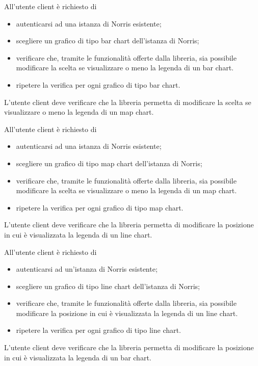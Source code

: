 		All'utente client è richiesto di
		\begin{itemize}
			\item autenticarsi ad una istanza di Norris esistente;
			\item scegliere un grafico di tipo bar chart dell'istanza di Norris;
			\item verificare che, tramite le funzionalità offerte dalla libreria, sia possibile modificare la scelta se visualizzare o meno la legenda di un bar chart.
			\item ripetere la verifica per ogni grafico di tipo bar chart.
		\end{itemize}

	L'utente client deve verificare che la libreria permetta di modificare la scelta se visualizzare o meno la legenda di un map chart.
		
		All'utente client è richiesto di
		\begin{itemize}
			\item autenticarsi ad una istanza di Norris esistente;
			\item scegliere un grafico di tipo map chart dell'istanza di Norris;
			\item verificare che, tramite le funzionalità offerte dalla libreria, sia possibile modificare la scelta se visualizzare o meno la legenda di un map chart.
			\item ripetere la verifica per ogni grafico di tipo map chart.
		\end{itemize}

	L'utente client deve verificare che la libreria permetta di modificare la posizione in cui è visualizzata la legenda di un line chart.
		
		All'utente client è richiesto di
		\begin{itemize}
			\item autenticarsi ad un'istanza di Norris esistente;
			\item scegliere un grafico di tipo line chart dell'istanza di Norris;
			\item verificare che, tramite le funzionalità offerte dalla libreria, sia possibile modificare la posizione in cui è visualizzata la legenda di un line chart.
			\item ripetere la verifica per ogni grafico di tipo line chart.
		\end{itemize}

	L'utente client deve verificare che la libreria permetta di modificare la posizione in cui è visualizzata la legenda di un bar chart.
		
